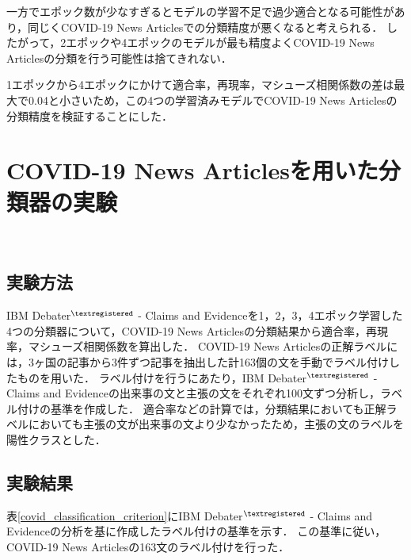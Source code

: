 \documentclass[12pt,a4j,dvipdfmx]{jreport}
\begin{document}
一方でエポック数が少なすぎるとモデルの学習不足で過少適合となる可能性があり，同じくCOVID-19 News Articlesでの分類精度が悪くなると考えられる．
したがって，2エポックや4エポックのモデルが最も精度よくCOVID-19 News Articlesの分類を行う可能性は捨てきれない．

1エポックから4エポックにかけて適合率，再現率，マシューズ相関係数の差は最大で0.04と小さいため，この4つの学習済みモデルでCOVID-19 News Articlesの分類精度を検証することにした．

\section{COVID-19 News Articlesを用いた分類器の実験}
\label{section_covid_classification_experiment}
~

\subsection{実験方法}
IBM Debater$^{\textregistered}$ - Claims and Evidenceを1，2，3，4エポック学習した4つの分類器について，COVID-19 News Articlesの分類結果から適合率，再現率，マシューズ相関係数を算出した．
COVID-19 News Articlesの正解ラベルには，3ヶ国の記事から3件ずつ記事を抽出した計163個の文を手動でラベル付けしたものを用いた．
ラベル付けを行うにあたり，IBM Debater$^{\textregistered}$ - Claims and Evidenceの出来事の文と主張の文をそれぞれ100文ずつ分析し，ラベル付けの基準を作成した．
適合率などの計算では，分類結果においても正解ラベルにおいても主張の文が出来事の文より少なかったため，主張の文のラベルを陽性クラスとした．


\newpage

\subsection{実験結果}
表\ref{covid_classification_criterion}にIBM Debater$^{\textregistered}$ - Claims and Evidenceの分析を基に作成したラベル付けの基準を示す．
この基準に従い，COVID-19 News Articlesの163文のラベル付けを行った．
\end{document}
